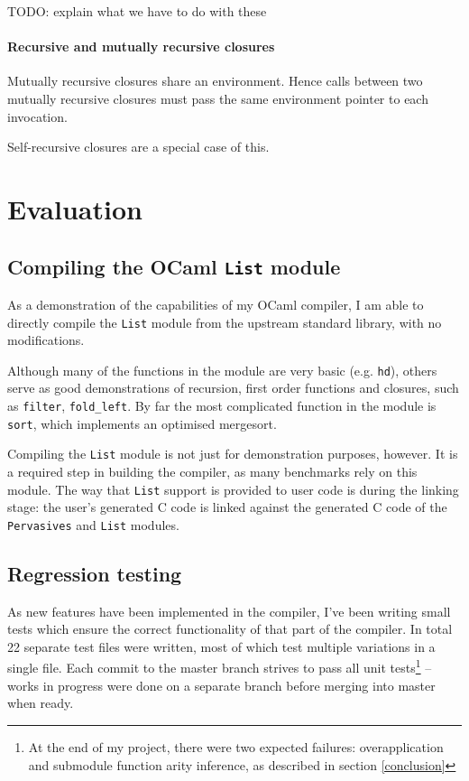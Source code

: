 \documentclass[12pt,a4paper,twoside,openright]{report}
\begin{document}
TODO: explain what we have to do with these

\subsubsection{Recursive and mutually recursive closures}

Mutually recursive closures share an environment. Hence calls between two
mutually recursive closures must pass the same environment pointer to each
invocation.

Self-recursive closures are a special case of this.



\chapter{Evaluation}

\section{Compiling the OCaml \texttt{List} module}\label{module-list}

As a demonstration of the capabilities of my OCaml compiler, I am able to
directly compile the \lstinline!List! module from the upstream standard
library, with no modifications.

Although many of the functions in the module are very basic (e.g.
\lstinline!hd!), others serve as good demonstrations of recursion, first order
functions and closures, such as \lstinline!filter!, \lstinline!fold_left!. By
far the most complicated function in the module is \lstinline!sort!, which
implements an optimised mergesort.

Compiling the \lstinline!List! module is not just for demonstration purposes,
however. It is a required step in building the compiler, as many benchmarks
rely on this module. The way that \lstinline!List! support is provided to user
code is during the linking stage: the user's generated C code is linked
against the generated C code of the \lstinline!Pervasives! and \lstinline!List!
modules.

\section{Regression testing}\label{regression-testing}

As new features have been implemented in the compiler, I've been writing small
tests which ensure the correct functionality of that part of the compiler. In
total 22 separate test files were written, most of which test multiple
variations in a single file. Each commit to the master branch strives to pass
all unit tests\footnote{At the end of my project, there were two expected
  failures: overapplication and submodule function arity inference, as
  described in section \ref{conclusion}}
-- works in progress were done on a separate branch before merging into master
when ready.
\end{document}
